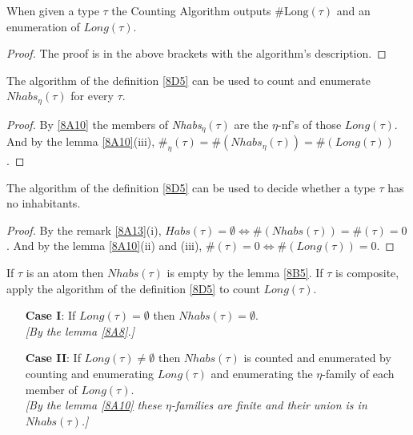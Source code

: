 \documentclass[a4paper,10pt]{article}
\begin{document}
\begin{theo}\label{8D4}When given a type $\tau$ the Counting Algorithm outputs $\# \mbox{Long}(\tau)$ and an enumeration 
 of $Long(\tau)$.
\begin{proof}
 The proof is in the above brackets with the algorithm's description. 
\end{proof}
\end{theo}

\begin{col}\label{8D5.1}The algorithm of the definition \ref{8D5} can be used to count and enumerate
$Nhabs_{\eta}(\tau)$ for every $\tau$.
\begin{proof}
By \ref{8A10} the members of \textit{Nhabs}$_{\eta}(\tau)$ are the $\eta$-nf's of those $Long(\tau)$. And by the lemma \ref{8A10}(iii), 
$\#_{\eta}(\tau) = \#(Nhabs_{\eta}(\tau)) = \#(Long(\tau))$.
\end{proof}
\end{col}

\begin{col}\label{8D5.2} The algorithm of the definition \ref{8D5} can be used to decide whether a type $\tau$ has no inhabitants.
\begin{proof}
By the remark \ref{8A13}(i), $Habs(\tau) = \emptyset \Leftrightarrow \#(Nhabs(\tau)) = \#(\tau) = 0$. And by the lemma \ref{8A10}(ii) and (iii),
$\#(\tau) = 0 \Leftrightarrow \#(Long(\tau)) = 0$.
\end{proof}
\end{col}

\begin{mydef}\label{8D7} If $\tau$ is an atom then $Nhabs(\tau)$ is empty by the lemma \ref{8B5}. 
If $\tau$ is composite, apply the algorithm of the definition \ref{8D5} to count $Long(\tau)$.
\begin{itemize}
 \item[\textbf{Case I}:] If $Long(\tau) = \emptyset$ then $Nhabs(\tau) = \emptyset$.\\ 
 
 {\em [By the lemma \ref{8A8}.]}
 
 \item[\textbf{Case II}:] If $Long(\tau) \neq \emptyset$ then $Nhabs(\tau)$ is counted and enumerated by counting and 
 enumerating $Long(\tau)$ and enumerating the $\eta$-family of each member of $Long(\tau)$.\\
 
 {\em [By the lemma \ref{8A10} these $\eta$-families are finite and their union is in $Nhabs(\tau)$.] }
 
\end{itemize}
\end{mydef}
\end{document}
